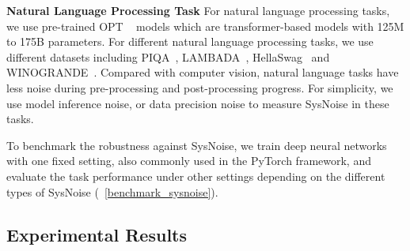 \textbf{Natural Language Processing Task}
For natural language processing tasks, we use pre-trained OPT ~\cite{opt} models which are transformer-based models with 125M to 175B parameters. For different natural language processing tasks, we use different datasets including PIQA~\cite{piqa}, LAMBADA~\cite{paperno-etal-2016-lambada}, HellaSwag~\cite{hellaswag} and WINOGRANDE~\cite{winogrande}.
Compared with computer vision, natural language tasks have less noise during pre-processing and post-processing progress. For simplicity, we use model inference noise, or data precision noise to measure SysNoise in these tasks.

To benchmark the robustness against SysNoise, we train deep neural networks with one fixed setting, also commonly used in the PyTorch framework, and evaluate the task performance under other settings depending on the different types of SysNoise (~\autoref{benchmark_sysnoise}).

\subsection{Experimental Results}
\label{sec_results}

